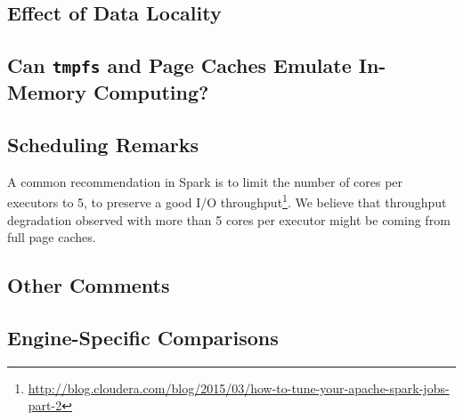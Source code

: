 \documentclass{IEEEtran}
\begin{document}
\subsection{Effect of Data Locality}


\subsection{Can \texttt{tmpfs} and Page Caches Emulate In-Memory Computing?}


\subsection{Scheduling Remarks}


A common recommendation in Spark is to limit the number of cores per 
executors to 5, to preserve a good I/O 
throughput\footnote{\url{http://blog.cloudera.com/blog/2015/03/how-to-tune-your-apache-spark-jobs-part-2}}. 
We believe that throughput degradation observed with more than 5 cores 
per executor might be coming from full page caches.

\subsection{Other Comments}




\subsection{Engine-Specific Comparisons}
\end{document}
